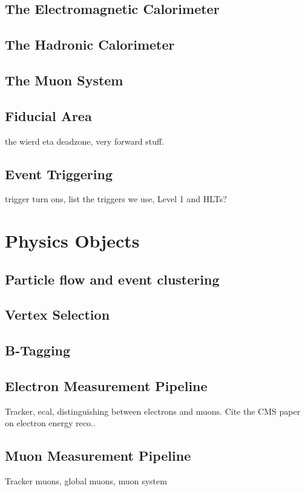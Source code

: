 \subsection{The Electromagnetic Calorimeter}
\subsection{The Hadronic Calorimeter}
\subsection{The Muon System}
\subsection{Fiducial Area}
the wierd eta deadzone, very forward stuff.
\subsection{Event Triggering} \label{sec:event_triggering}
trigger turn ons, list the triggers we use, Level 1 and HLTs?


\section{Physics Objects}
\subsection{Particle flow and event clustering} \label{sec:particle_flow}
\subsection{Vertex Selection}
\subsection{B-Tagging}
\subsection{Electron Measurement Pipeline} \label{sec:electron_measurement_pipeline}
Tracker, ecal, distinguishing between electrons and muons. Cite the CMS paper on electron energy reco..
\subsection{Muon Measurement Pipeline} \label{sec:muon_measurement_pipeline}
Tracker muons, global muons, muon system
